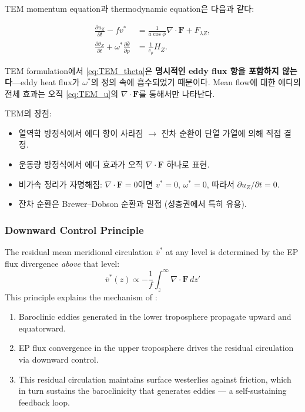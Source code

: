 
\noindent
TEM momentum equation과 thermodynamic equation은 다음과 같다:

\begin{align}
  \frac{\partial u_Z}{\partial t} - fv^*
    &= \frac{1}{a\cos\phi}\nabla\cdot\mathbf{F} + F_{\lambda Z},
  \label{eq:TEM_u}\\[4pt]
  \frac{\partial\theta_Z}{\partial t}
    + \omega^*\frac{\partial\bar{\theta}}{\partial p}
    &= \frac{1}{c_p}H_Z.
  \label{eq:TEM_theta}
\end{align}

\begin{remark}
TEM formulation에서 \eqref{eq:TEM_theta}은 \textbf{명시적인 eddy flux 항을
포함하지 않는다}---eddy heat flux가 $\omega^*$의 정의 속에 흡수되었기 때문이다.
Mean flow에 대한 에디의 전체 효과는 오직 \eqref{eq:TEM_u}의
$\nabla\cdot\mathbf{F}$를 통해서만 나타난다.
\end{remark}

\begin{hisublock}
TEM의 장점:
\begin{itemize}
  \item 열역학 방정식에서 에디 항이 사라짐 $\to$ 잔차 순환이 단열 가열에 의해 직접 결정.
  \item 운동량 방정식에서 에디 효과가 오직 $\nabla\cdot\mathbf{F}$ 하나로 표현.
  \item 비가속 정리가 자명해짐: $\nabla\cdot\mathbf{F} = 0$이면 $v^* = 0$, $\omega^* = 0$,
    따라서 $\partial u_Z/\partial t = 0$.
  \item 잔차 순환은 Brewer--Dobson 순환과 밀접 (성층권에서 특히 유용).
\end{itemize}
\end{hisublock}


\subsubsection{Downward Control Principle}

\begin{remark}
The residual mean meridional circulation $\bar{v}^*$ at any level is determined by the EP flux divergence \emph{above} that level:
$$\bar{v}^*(z) \propto -\frac{1}{f}\int_z^\infty \nabla\cdot\mathbf{F}\,dz'$$
This principle explains the mechanism of :
\begin{enumerate}
\item Baroclinic eddies generated in the lower troposphere propagate upward and equatorward.
\item EP flux convergence in the upper troposphere drives the residual circulation via downward control.
\item This residual circulation maintains surface westerlies against friction, which in turn sustains the baroclinicity that generates eddies --- a self-sustaining feedback loop.
\end{enumerate}
\end{remark}

